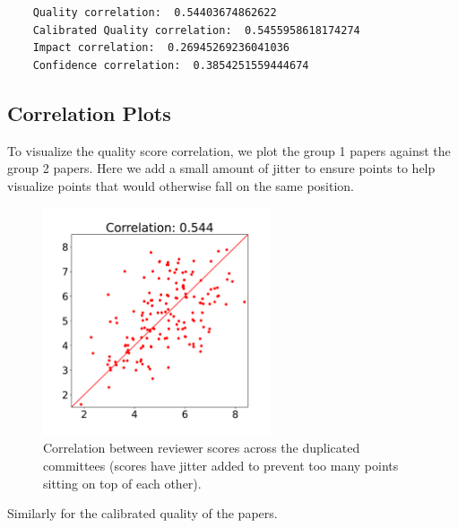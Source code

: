 \begin{verbatim}
    Quality correlation:  0.54403674862622
    Calibrated Quality correlation:  0.5455958618174274
    Impact correlation:  0.26945269236041036
    Confidence correlation:  0.3854251559444674
\end{verbatim}

\hypertarget{correlation-plots}{%
\subsection{Correlation Plots}\label{correlation-plots}}

To visualize the quality score correlation, we plot the group 1 papers
against the group 2 papers. Here we add a small amount of jitter to
ensure points to help visualize points that would otherwise fall on the
same position.

\begin{figure}[htb]
\includegraphics[width=0.60\textwidth]{diagrams/neurips/quality-correlation.pdf}


\caption{Correlation between reviewer scores across the duplicated committees (scores have jitter added to prevent too many points sitting on top of each other).}
\label{quality-correlation}
\end{figure}

Similarly for the calibrated quality of the papers.

